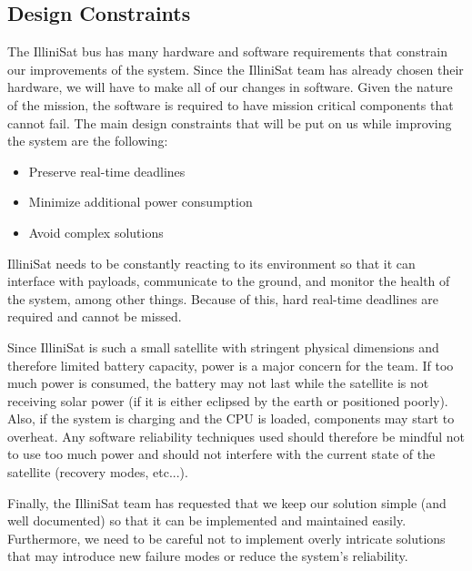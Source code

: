 \subsection{Design Constraints}
The IlliniSat bus has many hardware and software requirements that constrain our
improvements of the system. Since the IlliniSat team has already chosen their
hardware, we will have to make all of our changes in software. Given the nature
of the mission, the software is required to have mission critical components
that cannot fail. The main design constraints that will be put on us while
improving the system are the following:
\begin{itemize}
  \item Preserve real-time deadlines
  \item Minimize additional power consumption
  \item Avoid complex solutions
\end{itemize}
IlliniSat needs to be constantly reacting to its environment so that it can
interface with payloads, communicate to the ground, and monitor the health of
the system, among other things. Because of this, hard real-time deadlines are
required and cannot be missed. 

Since IlliniSat is such a small satellite with stringent physical dimensions and
therefore limited battery capacity, power is a major concern for the team.  If
too much power is consumed, the battery may not last while the satellite is not
receiving solar power (if it is either eclipsed by the earth or positioned
poorly).  Also, if the system is charging and the CPU is loaded, components may
start to overheat.  Any software reliability techniques used should therefore be
mindful not to use too much power and should not interfere with the current state
of the satellite (recovery modes, etc...).

Finally, the IlliniSat team has requested that we keep our solution simple (and
well documented) so that it can be implemented and maintained easily.
Furthermore, we need to be careful not to implement overly intricate solutions
that may introduce new failure modes or reduce the system's reliability.
